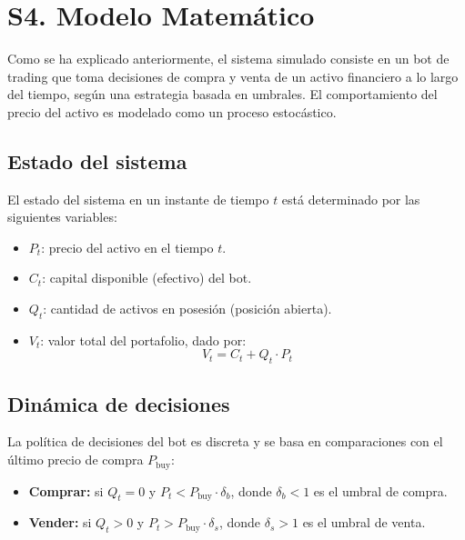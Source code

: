 \documentclass[a4paper,12pt]{article}
\begin{document}

\section*{S4. Modelo Matemático}
Como se ha explicado anteriormente, el sistema simulado consiste en un bot de trading que toma decisiones de compra y venta de un activo financiero a lo largo del tiempo, según una estrategia basada en umbrales. El comportamiento del precio del activo es modelado como un proceso estocástico.

\subsection*{Estado del sistema}

El estado del sistema en un instante de tiempo $t$ está determinado por las siguientes variables:

\begin{itemize}
    \item $P_t$: precio del activo en el tiempo $t$.
    \item $C_t$: capital disponible (efectivo) del bot.
    \item $Q_t$: cantidad de activos en posesión (posición abierta).
    \item $V_t$: valor total del portafolio, dado por:
    \[
    V_t = C_t + Q_t \cdot P_t
    \]
\end{itemize}

\subsection*{Dinámica de decisiones}

La política de decisiones del bot es discreta y se basa en comparaciones con el último precio de compra $P_{\text{buy}}$:

\begin{itemize}
    \item \textbf{Comprar:} si $Q_t = 0$ y $P_t < P_{\text{buy}} \cdot \delta_b$, donde $\delta_b < 1$ es el umbral de compra.
    \item \textbf{Vender:} si $Q_t > 0$ y $P_t > P_{\text{buy}} \cdot \delta_s$, donde $\delta_s > 1$ es el umbral de venta.
\end{itemize}
\end{document}
